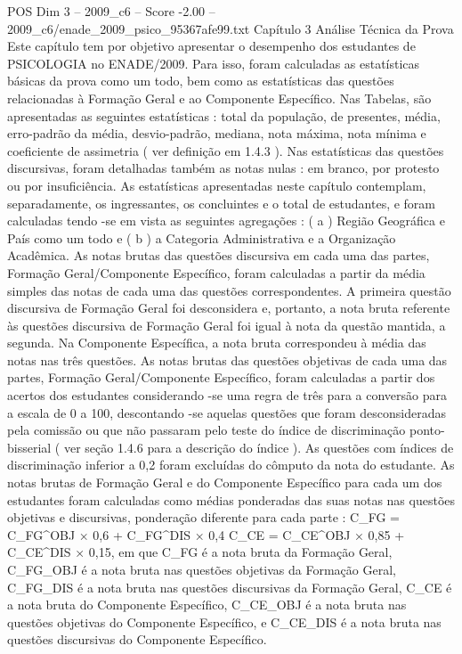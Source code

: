 \begin{textsample}{POS Dim 3 – 2009\_c6 – Score -2.00 – 2009\_c6/enade\_2009\_psico\_95367afe99.txt}  \label{ex:f3_pos_237}
Capítulo 3 Análise Técnica da Prova Este capítulo tem por objetivo apresentar o desempenho dos estudantes de PSICOLOGIA no ENADE/2009.
Para isso, foram calculadas as estatísticas básicas da prova como um todo, bem como as estatísticas das questões relacionadas à Formação Geral e ao Componente Específico.
Nas Tabelas, são apresentadas as seguintes estatísticas : total da população, de presentes, média, erro-padrão da média, desvio-padrão, mediana, nota máxima, nota mínima e coeficiente de assimetria ( ver definição em 1.4.3 ).
Nas estatísticas das questões discursivas, foram detalhadas também as notas nulas : em branco, por protesto ou por insuficiência.
As estatísticas apresentadas neste capítulo contemplam, separadamente, os ingressantes, os concluintes e o total de estudantes, e foram calculadas tendo -se em vista as seguintes agregações : ( a ) Região Geográfica e País como um todo e ( b ) a Categoria Administrativa e a Organização Acadêmica.
As notas brutas das questões discursiva em cada uma das partes, Formação Geral/Componente Específico, foram calculadas a partir da média simples das notas de cada uma das questões correspondentes.
A primeira questão discursiva de Formação Geral foi desconsidera e, portanto, a nota bruta referente às questões discursiva de Formação Geral foi igual à nota da questão mantida, a segunda.
Na Componente Específica, a nota bruta correspondeu à média das notas nas três questões.
As notas brutas das questões objetivas de cada uma das partes, Formação Geral/Componente Específico, foram calculadas a partir dos acertos dos estudantes considerando -se uma regra de três para a conversão para a escala de 0 a 100, descontando -se aquelas questões que foram desconsideradas pela comissão ou que não passaram pelo teste do índice de discriminação ponto-bisserial ( ver seção 1.4.6 para a descrição do índice ).
As questões com índices de discriminação inferior a 0,2 foram excluídas do cômputo da nota do estudante.
As notas brutas de Formação Geral e do Componente Específico para cada um dos estudantes foram calculadas como médias ponderadas das suas notas nas questões objetivas e discursivas, ponderação diferente para cada parte : C\_FG = C\_FG\textasciicircum{}OBJ × 0,6 + C\_FG\textasciicircum{}DIS × 0,4 C\_CE = C\_CE\textasciicircum{}OBJ × 0,85 + C\_CE\textasciicircum{}DIS × 0,15, em que C\_FG é a nota bruta da Formação Geral, C\_FG\_OBJ é a nota bruta nas questões objetivas da Formação Geral, C\_FG\_DIS é a nota bruta nas questões discursivas da Formação Geral, C\_CE é a nota bruta do Componente Específico, C\_CE\_OBJ é a nota bruta nas questões objetivas do Componente Específico, e C\_CE\_DIS é a nota bruta nas questões discursivas do Componente Específico.

\end{textsample}
